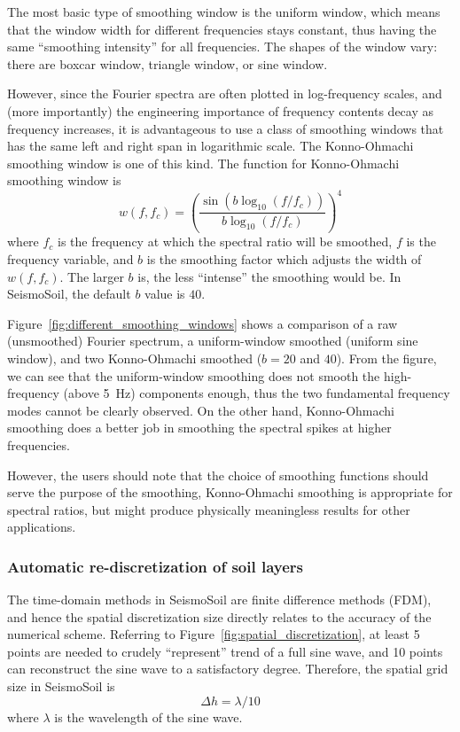 \documentclass[11pt,letterpaper]{article}
\begin{document}
The most basic type of smoothing window is the uniform window, which means that the window width for different frequencies stays constant, thus having the same ``smoothing intensity'' for all frequencies. The shapes of the window vary: there are boxcar window, triangle window, or sine window.

 However, since the Fourier spectra are often plotted in log-frequency scales, and (more importantly) the engineering importance of frequency contents decay as frequency increases, it is advantageous to use a class of smoothing windows that has the same left and right span in logarithmic scale. The Konno-Ohmachi smoothing window \citep{Konno_Ohmachi_1998} is one of this kind. The function for Konno-Ohmachi smoothing window is
\begin{equation}\label{eq:konno-ohmachi}
	w(f,f_c) = \left(   \frac{ \sin\left(  b\log_{10}(f/f_c)  \right) }{ b\log_{10}(f/f_c) }   \right)^4
\end{equation}
where $f_c$ is the frequency at which the spectral ratio will be smoothed, $f$ is the frequency variable, and $b$ is the smoothing factor which adjusts the width of $w(f,f_c)$. The larger $b$ is, the less ``intense'' the smoothing would be. In SeismoSoil, the default $b$ value is $40$.

Figure~\ref{fig:different_smoothing_windows} shows a comparison of a raw (unsmoothed) Fourier spectrum, a uniform-window smoothed (uniform sine window), and two Konno-Ohmachi smoothed ($b=20$ and $40$). From the figure, we can see that the uniform-window smoothing does not smooth the high-frequency (above 5~Hz) components enough, thus the two fundamental frequency modes cannot be clearly observed. On the other hand, Konno-Ohmachi smoothing does a better job in smoothing the spectral spikes at higher frequencies.

However, the users should note that the choice of smoothing functions should serve the purpose of the smoothing, Konno-Ohmachi smoothing is appropriate for spectral ratios, but might produce physically meaningless results for other applications.


\subsubsection{Automatic re-discretization of soil layers}\label{sec:rediscretization}

The time-domain methods in SeismoSoil are finite difference methods (FDM), and hence the spatial discretization size directly relates to the accuracy of the numerical scheme. Referring to Figure~\ref{fig:spatial_discretization}, at least 5 points are needed to crudely ``represent'' trend of a full sine wave, and 10 points can reconstruct the sine wave to a satisfactory degree. Therefore, the spatial grid size in SeismoSoil is
\[
\Delta h = \lambda/10
\]
where $ \lambda $ is the wavelength of the sine wave.
\end{document}
